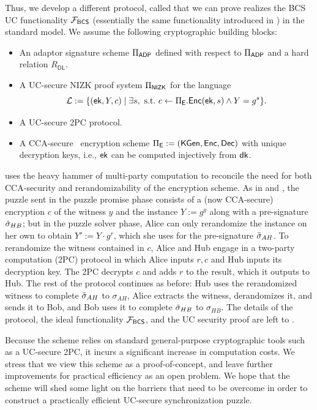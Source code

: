 Thus, we develop a different protocol, called \AALUC %
that we can prove realizes the BCS UC functionality $\mathcal{F}_{\sf BCS}$ (essentially the same functionality introduced in \cite{SP:TaiMorMaf21}) in the standard model. We assume the following cryptographic building blocks:
\begin{itemize}
    \item An adaptor signature scheme $\Pi_{\mathsf{ADP}}$ defined with respect to $\Pi_{\mathsf{ADP}}$ and a hard relation $R_\mathsf{DL}$.
    \item A UC-secure NIZK proof system $\Pi_{\mathsf{NIZK}}$ for the language $$\mathcal{L} := \{ (\mathsf{ek}, Y,c) \mid \exists s, \mathrm{~s.t.~} c \gets \Pi_{\mathsf{E}}.\mathsf{Enc}(\mathsf{ek}, s) \land Y = g^s \}. $$ 
    \item A UC-secure 2PC protocol.
    \item A CCA-secure~\cite{FOCS:BDJR97} encryption scheme $\Pi_{\mathsf{E}} := (\mathsf{KGen}, \mathsf{Enc}, \mathsf{Dec})$ with unique decryption keys, i.e., $\mathsf{ek}$ can be computed injectively from $\mathsf{dk}$.
\end{itemize}

\AALUC uses the heavy hammer of multi-party computation to reconcile the need for both CCA-security and rerandomizability of the encryption scheme. As in \AAL and \AALplus, the puzzle sent in the puzzle promise phase consists of a (now CCA-secure) encryption $c$ of the witness $y$ and the instance $Y := g^y$ along with a pre-signature $\tilde{\sigma}_{HB}$; but in the puzzle solver phase, Alice can only rerandomize the instance on her own to obtain $Y' := Y \cdot g^r$, which she uses for the pre-signature $\tilde{\sigma}_{AH}$. To rerandomize the witness contained in $c$, Alice and Hub engage in a two-party computation (2PC) protocol in which Alice inputs $r, c$ and Hub inputs its decryption key. The 2PC decrypts $c$ and adds $r$ to the result, which it outputs to Hub. The rest of the protocol continues as before: Hub uses the rerandomized witness to complete $\tilde{\sigma}_{AH}$ to $\sigma_{AH}$, Alice extracts the witness, derandomizes it, and sends it to Bob, and Bob uses it to complete $\tilde{\sigma}_{HB}$ to $\sigma_{HB}$. The details of the protocol, the ideal functionality $\mathcal{F}_{\sf BCS}$, and the UC security proof are left to \cite{CCS:GMMMTT22}.

Because the scheme relies on standard general-purpose cryptographic tools such as a UC-secure 2PC, it incurs a significant increase in computation costs. We stress that we view this scheme as a proof-of-concept, and leave further improvements for practical efficiency as an open problem.  We hope that the scheme will shed some light on the barriers that need to be overcome in order to construct a practically efficient UC-secure synchronization puzzle.